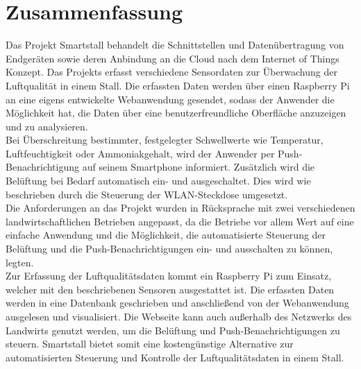 \documentclass[conference]{IEEEtran}
\begin{document}
\section{Zusammenfassung}
Das Projekt Smartstall behandelt die Schnittstellen und Datenübertragung von Endgeräten sowie deren Anbindung an die Cloud nach dem Internet of Things Konzept. Das Projekts erfasst verschiedene Sensordaten zur Überwachung der Luftqualität in einem Stall. Die erfassten Daten werden über einen Raspberry Pi an eine eigens entwickelte Webanwendung gesendet, sodass der Anwender die Möglichkeit hat, die Daten über eine benutzerfreundliche Oberfläche anzuzeigen und zu analysieren. \\
Bei Überschreitung bestimmter, festgelegter Schwellwerte wie Temperatur, Luftfeuchtigkeit oder Ammoniakgehalt, wird der Anwender per Push-Benachrichtigung auf seinem Smartphone informiert. Zusätzlich wird die Belüftung bei Bedarf automatisch ein- und ausgeschaltet. Dies wird wie beschrieben durch die Steuerung der WLAN-Steckdose umgesetzt. \\
Die Anforderungen an das Projekt wurden in Rücksprache mit zwei verschiedenen landwirtschaftlichen Betrieben angepasst, da die Betriebe  vor allem Wert auf eine einfache Anwendung und die Möglichkeit, die automatisierte Steuerung der Belüftung und die Push-Benachrichtigungen ein- und ausschalten zu können, legten. \\
Zur Erfassung der Luftqualitätsdaten kommt ein Raspberry Pi zum Einsatz, welcher mit den beschriebenen Sensoren ausgestattet ist. Die erfassten Daten werden in eine Datenbank geschrieben und anschließend von der Webanwendung ausgelesen und visualisiert. Die Webseite kann auch außerhalb des Netzwerks des Landwirts genutzt werden, um die Belüftung und Push-Benachrichtigungen zu steuern. Smartstall bietet somit eine kostengünstige Alternative zur automatisierten Steuerung und Kontrolle der Luftqualitätsdaten in einem Stall. \\
\newpage
\end{document}
